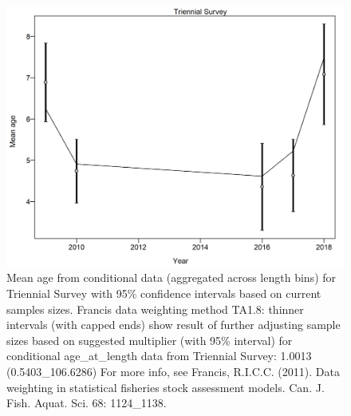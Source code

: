 \documentclass[12pt,]{article}
\begin{document}
\begin{figure}
\centering
\includegraphics{./r4ss/plots_mod1/comp_condAALfit_data_weighting_TA1.8_condAgeTriennial Survey.png}
\caption{Mean age from conditional data (aggregated across length bins)
for Triennial Survey with 95\% confidence intervals based on current
samples sizes. Francis data weighting method TA1.8: thinner intervals
(with capped ends) show result of further adjusting sample sizes based
on suggested multiplier (with 95\% interval) for conditional
age\_at\_length data from Triennial Survey: 1.0013 (0.5403\_106.6286)
For more info, see Francis, R.I.C.C. (2011). Data weighting in
statistical fisheries stock assessment models. Can. J. Fish. Aquat. Sci.
68: 1124\_1138.
\label{fig:mod1_7_comp_condAALfit_data_weighting_TA1.8_condAgeTriennial Survey}}
\end{figure}
\end{document}
